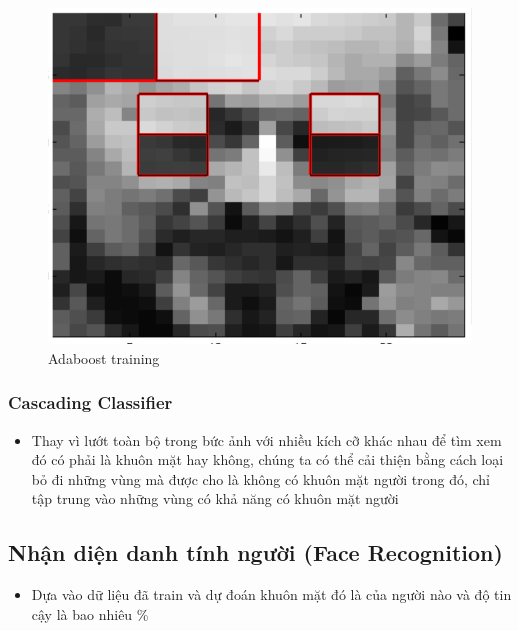\documentclass[a4paper]{article}
\begin{document}
\begin{figure} [H]
    \centering
    \includegraphics[scale=0.45]{adaboost.png}
    \caption{ Adaboost training  }
    \label{fig:adaboost}
\end{figure}

\subsubsection{Cascading Classifier}
\begin{itemize}
    \item Thay vì lướt toàn bộ trong bức ảnh với nhiều kích cỡ khác nhau để tìm xem đó có phải là khuôn mặt hay không, chúng ta có thể cải thiện bằng cách loại bỏ đi những vùng mà được cho là không có khuôn mặt người trong đó, chỉ tập trung vào những vùng có khả năng có khuôn mặt người  
\end{itemize}

\subsection{Nhận diện danh tính người (Face Recognition)}
\begin{itemize}
    \item Dựa vào dữ liệu đã train và dự đoán khuôn mặt đó là của người nào và độ tin cậy là bao nhiêu \% 
\end{itemize}
\end{document}
